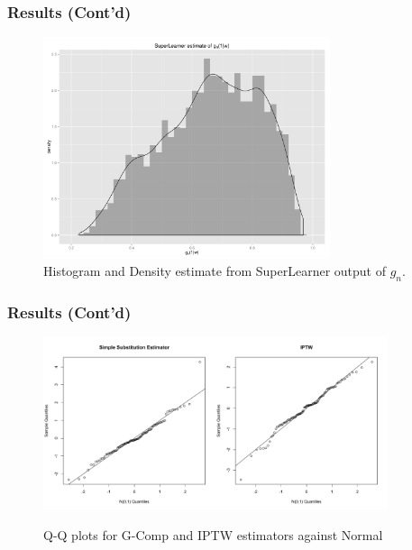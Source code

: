 \documentclass{beamer}
\begin{document}
\begin{frame}
\frametitle{Results (Cont'd)}
\begin{figure}
\centering
\includegraphics[width=0.75\textwidth]{density-plot_ghat.pdf}
\caption{Histogram and Density estimate from SuperLearner output of $g_n$.}
\end{figure}
\end{frame}

\begin{frame}
\frametitle{Results (Cont'd)}
\begin{figure}
\centering
\includegraphics[width=0.45\textwidth]{simplesub_qqplot.pdf}\includegraphics[width=0.45\textwidth]{iptw_qqplot.pdf}
\caption{Q-Q plots for G-Comp and IPTW estimators against Normal}
\end{figure}
\end{frame}
\end{document}
